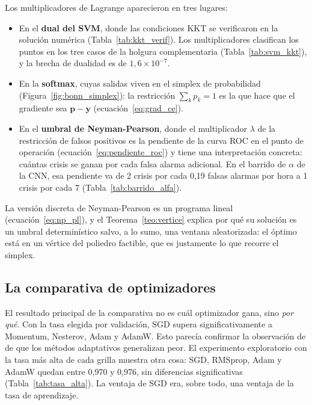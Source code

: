 Los multiplicadores de Lagrange aparecieron en tres lugares:
\begin{itemize}
  \item En el \textbf{dual del SVM}, donde las condiciones KKT se verificaron en la solución numérica (Tabla~\ref{tab:kkt_verif}).
        Los multiplicadores clasifican los puntos en los tres casos de la holgura complementaria (Tabla~\ref{tab:svm_kkt}),
        y la brecha de dualidad es de $1{,}6\times10^{-7}$.
  \item En la \textbf{softmax}, cuyas salidas viven en el simplex de probabilidad (Figura~\ref{fig:bonn_simplex}): la
        restricción $\sum_k p_k = 1$ es la que hace que el gradiente sea $\mathbf{p} - \mathbf{y}$ (ecuación~\eqref{eq:grad_ce}).
  \item En el \textbf{umbral de Neyman-Pearson}, donde el multiplicador $\lambda$ de la restricción de falsos positivos es la
        pendiente de la curva ROC en el punto de operación (ecuación~\eqref{eq:pendiente_roc}) y tiene una interpretación
        concreta: cuántas crisis se ganan por cada falsa alarma adicional. En el barrido de $\alpha$ de la CNN, esa pendiente
        va de 2 crisis por cada 0,19 falsas alarmas por hora a 1 crisis por cada 7 (Tabla~\ref{tab:barrido_alfa}).
\end{itemize}
La versión discreta de Neyman-Pearson es un programa lineal (ecuación~\eqref{eq:np_pl}), y el Teorema~\ref{teo:vertice}
explica por qué su solución es un umbral determinístico salvo, a lo sumo, una ventana aleatorizada: el óptimo está en un
vértice del poliedro factible, que es justamente lo que recorre el simplex.

\subsection{La comparativa de optimizadores}

El resultado principal de la comparativa no es cuál optimizador gana, sino \emph{por qué}. Con la tasa elegida por
validación, SGD supera significativamente a Momentum, Nesterov, Adam y AdamW. Esto parecía confirmar la observación de
\textcite{wilson2017} de que los métodos adaptativos generalizan peor. El experimento exploratorio con la tasa más alta de
cada grilla muestra otra cosa: SGD, RMSprop, Adam y AdamW quedan entre 0,970 y 0,976, sin diferencias significativas
(Tabla~\ref{tab:tasa_alta}). La ventaja de SGD era, sobre todo, una ventaja de la tasa de aprendizaje.

